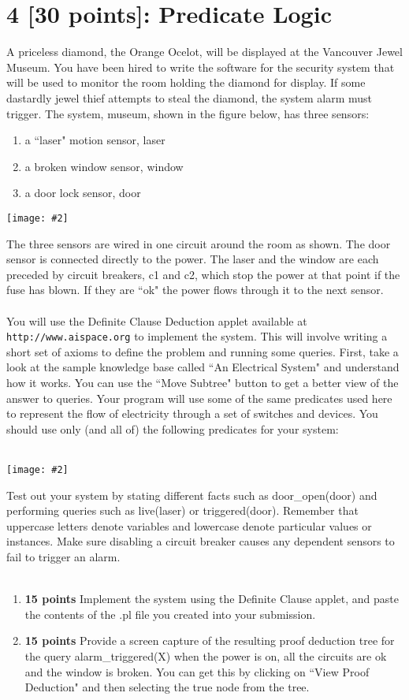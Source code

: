 \documentclass{article}
\newcommand{\centerfig}[2]{\begin{center}\texttt{[image: \#2]}\end{center}}
\begin{document}
\section{4 [30 points]: Predicate Logic}
A priceless diamond, the Orange Ocelot, will be displayed at the Vancouver Jewel Museum. You have been hired to write the software for the security system that will be used to monitor the room holding the diamond for display. If some dastardly jewel thief attempts to steal the diamond, the system alarm must trigger. The system, museum, shown in the figure below, has three sensors:
\begin{enumerate}
    \item a “laser" motion sensor, laser
    \item a broken window sensor, window
    \item a door lock sensor, door
\end{enumerate}
\centerfig{0.7}{../figs/fig3.png}
The three sensors are wired in one circuit around the room as shown. The door sensor is connected directly to the power. The laser and the window are each preceded by circuit breakers, c1 and c2, which stop the power at that point if the fuse has blown. If they are “ok" the power flows through it to the next sensor. \\ \\
You will use the Definite Clause Deduction applet available at \texttt{http://www.aispace.org} to implement the system. This will involve writing a short set of axioms to define the problem and running some queries. First, take a look at the sample knowledge base called “An Electrical System" and understand how it works. You can use the “Move Subtree" button to get a better view of the answer to queries. Your program will use some of the same predicates used here to represent the flow of electricity through a set of switches and devices. You should use only (and all of) the following predicates for your system: \\ \\
\centerfig{0.7}{../figs/fig4.png}
Test out your system by stating different facts such as door\_open(door) and performing queries such as live(laser) or triggered(door). Remember that uppercase letters denote variables and lowercase denote particular values or instances. Make sure disabling a circuit breaker causes any dependent sensors to fail to trigger an alarm. \\ \\
\begin{enumerate}[label=(\alph*)]
    \item \textbf{15 points} Implement the system using the Definite Clause applet, and paste the contents of the .pl file you created into your submission.
    \item \textbf{15 points} Provide a screen capture of the resulting proof deduction tree for the query alarm\_triggered(X) when the power is on, all the circuits are ok and the window is broken. You can get this by clicking on “View Proof Deduction" and then selecting the true node from the tree.
\end{enumerate}
\end{document}
